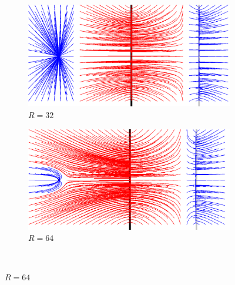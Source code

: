 \begin{appendices}
\begin{figure}[H]
   \begin{subfigure}[c]{.5\linewidth}
     \centering
     \includegraphics[width=\textwidth]{Chapters/Images/m1_radius_32.png}
     \caption{$R=32$}
   \end{subfigure}   
   \begin{subfigure}[c]{.5\linewidth}
     \centering
     \includegraphics[width=\textwidth]{Chapters/Images/m1_radius_64.png}
     \caption{$R=64$}
   \end{subfigure}\\
   

\end{figure}
\end{appendices}
